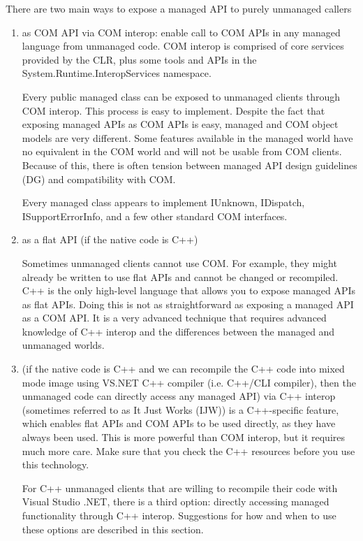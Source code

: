 There are two main ways to expose a managed API to purely unmanaged callers
\begin{enumerate}
  \item as COM API via COM interop: enable call to COM APIs in any managed
  language from unmanaged code. COM interop is comprised of core services provided by the CLR,
  plus some tools and APIs in the System.Runtime.InteropServices namespace.
  
  Every public managed class can be exposed to unmanaged clients through COM
  interop. This process is easy to implement. Despite the fact that exposing
  managed APIs as COM APIs is easy, managed and COM object models are very
  different.
  Some features available in the managed world have no equivalent in the COM
  world and will not be usable from COM clients. Because of this, there is often
  tension between managed API design guidelines (DG) and compatibility with COM.
  
  Every managed class appears to implement IUnknown, IDispatch,
  ISupportErrorInfo, and a few other standard COM interfaces. 
  
  \item as a flat API (if the native code is C++)
  
  Sometimes unmanaged clients cannot use COM. For example, they might already be
  written to use flat APIs and cannot be changed or recompiled. C++ is the only
  high-level language that allows you to expose managed APIs as flat APIs. Doing
  this is not as straightforward as exposing a managed API as a COM API. It is a
  very advanced technique that requires advanced knowledge of C++ interop and
  the differences between the managed and unmanaged worlds.  
  
  \item (if the native code is C++ and we can recompile the C++ code into mixed
  mode image using VS.NET C++ compiler (i.e. C++/CLI compiler), then the
  unmanaged code can directly access any managed API) via C++ interop (sometimes referred to as It Just
  Works (IJW)) is a C++-specific feature, which enables flat APIs and COM APIs
  to be used directly, as they have always been used. This is more powerful than
  COM interop, but it requires much more care. Make sure that you check the C++
  resources before you use this technology.
  
  For C++ unmanaged clients that are willing to recompile their code with Visual
  Studio .NET, there is a third option: directly accessing managed
  functionality through C++ interop. Suggestions for how and when to use these
  options are described in this section.  
\end{enumerate}

